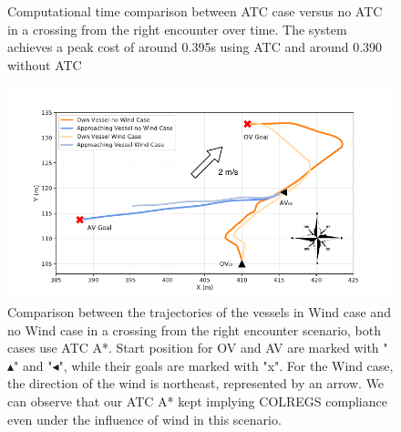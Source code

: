         \begin{figure}[H]
            \centering
                
                \caption{Computational time comparison between \ac{ATC} case versus no \ac{ATC} in a crossing from the right encounter over time. The system achieves a peak cost of around 0.395s using \ac{ATC} and around 0.390 without \ac{ATC}}
                \label{fig:plot_cr_w_vs_wo_CT}
        \end{figure}
        
        
        \begin{figure}[H]
            \centering
            \includegraphics[width=\textwidth]{figs/Chap5/plot_cr_w_vs_wind.pdf}
            \caption{Comparison between the trajectories of the vessels in Wind case and no Wind case in a crossing from the right encounter scenario, both cases use \ac{ATC} A*. Start position for \ac{OV} and \ac{AV} are marked with "$\blacktriangle$" and "$\blacktriangleleft$", while their goals are marked with "x". For the Wind case, the direction of the wind is northeast, represented by an arrow. We can observe that our \ac{ATC} A* kept implying COLREGS compliance even under the influence of wind in this scenario.}
            \label{fig:plot_cr_w_vs_wind}
        \end{figure}
        
